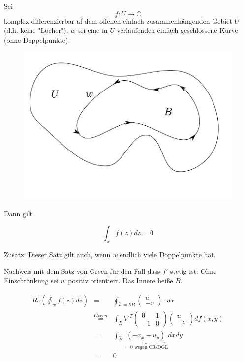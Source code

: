 \documentclass[10pt,a4paper]{article}
\begin{document}
\begin{satz}
Sei $$f:U \rightarrow \mathbb{C} $$ komplex differenzierbar af dem offenen einfach zusammenhängenden Gebiet $U$ (d.h. keine "Löcher"). $w$ sei eine in $U$ verlaufenden einfach geschlossene Kurve (ohne Doppelpunkte). 

\begin{figure}[H]
\includegraphics[width=\textwidth]{images/umlauf02}
\end{figure}


Dann gilt

$$\int_{w} f(z) dz = 0$$

Zusatz: Dieser Satz gilt auch, wenn $w$ endlich viele Doppelpunkte hat.
\end{satz}

Nachweis mit dem Satz von Green für den Fall dass $f'$ stetig ist:
Ohne Einschränkung sei $w$ positiv orientiert. Das Innere heiße $B$.


\begin{eqnarray*}
Re\left(  \oint_{w} f(z) dz  \right) &=& \oint_{\tilde{w}=\partial \tilde{B}} \begin{pmatrix}
u \\ -v
\end{pmatrix} \cdot dx \\
& \stackrel{Green}{=}& \int_{\tilde{B}} \nabla^{T} \begin{pmatrix}
0 & 1 \\ -1 & 0
\end{pmatrix} \begin{pmatrix}
u \\-v
\end{pmatrix} df(x,y) \\
&=& \int_{\tilde{B}} \underbrace{(-v_x - u_y)}_{= 0 \text{ wegen CR-DGL}} dx dy \\
&=& 0
\end{eqnarray*}
\end{document}
